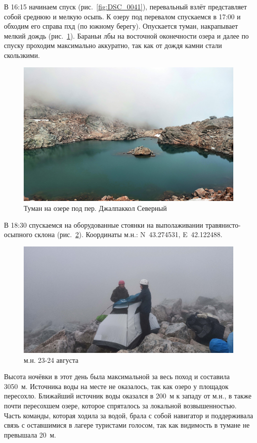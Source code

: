 В 16:15 начинаем спуск (рис.~\ref{fig:DSC_0041}), перевальный взлёт представляет собой среднюю и мелкую осыпь. К озеру под перевалом спускаемся в 17:00 и обходим его справа пхд (по южному берегу). Опускается туман, накрапывает мелкий дождь (рис.~\ref{fig:IMG_20240823_170306}). Бараньи лбы на восточной оконечности озера и далее по спуску проходим максимально аккуратно, так как от дождя камни стали скользкими.
 
\begin{figure}[h!]	
	\centering
	\includegraphics[angle=0, width=0.7\linewidth]{../pics/IMG_20240823_170306}
	\caption{Туман на озере под пер. Джалпаккол Северный}
	\label{fig:IMG_20240823_170306}
\end{figure}

В 18:30 спускаемся на оборудованные стоянки на выполаживании травянисто-осыпного склона (рис.~\ref{fig:IMG_20240823_184041}). Координаты м.н.: N~43.274531\degree, E~42.122488\degree.

\begin{figure}[h!]	
	\centering
	\includegraphics[angle=0, width=0.7\linewidth]{../pics/IMG_20240823_184041}
	\caption{м.н. 23-24 августа}
	\label{fig:IMG_20240823_184041}
\end{figure}

 Высота ночёвки в этот день была максимальной за весь поход и составила 3050~м. Источника воды на месте не оказалось, так как озеро у площадок пересохло. Ближайший источник воды оказался в 200~м к западу от м.н., в также почти пересохшем озере, которое спряталось за локальной возвышенностью. Часть команды, которая ходила за водой, брала с собой навигатор и поддерживала связь с оставшимися в лагере туристами голосом, так как видимость в тумане не превышала 20~м.



